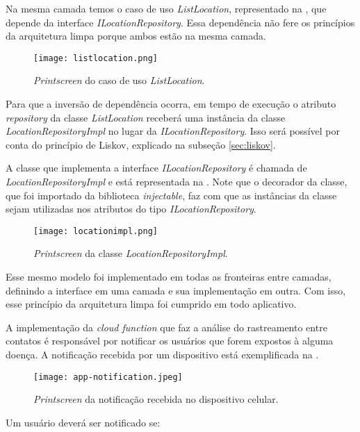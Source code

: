 Na mesma camada temos o caso de uso \textit{ListLocation}, representado na , que depende da interface \textit{ILocationRepository}. Essa dependência não fere os princípios da arquitetura limpa porque ambos estão na mesma camada.

\begin{figure}[!htb]
  \centering
  \texttt{[image: listlocation.png]}
  \caption{\textit{Printscreen} do caso de uso \textit{ListLocation}.}
  \label{fig:listlocation}
\end{figure}

Para que a inversão de dependência ocorra, em tempo de execução o atributo \textit{repository} da classe \textit{ListLocation} receberá uma instância da classe \textit{LocationRepositoryImpl} no lugar da \textit{ILocationRepository}. Isso será possível por conta do princípio de Liskov, explicado na subseção \ref{sec:liskov}.

A classe que implementa a interface \textit{ILocationRepository} é chamada de \textit{LocationRepositoryImpl} e está representada na . Note que o decorador da classe, que foi importado da biblioteca \textit{injectable}, faz com que as instâncias da classe sejam utilizadas nos atributos do tipo \textit{ILocationRepository}.

\begin{figure}[!htb]
  \centering
  \texttt{[image: locationimpl.png]}
  \caption{\textit{Printscreen} da classe \textit{LocationRepositoryImpl}.}
  \label{fig:locationimpl}
\end{figure}

Esse mesmo modelo foi implementado em todas as fronteiras entre camadas, definindo a interface em uma camada e sua implementação em outra. Com isso, esse princípio da arquitetura limpa foi cumprido em todo aplicativo.

A implementação da \textit{cloud function} que faz a análise do rastreamento entre contatos é responsável por notificar os usuários que forem expostos à alguma doença. A notificação recebida por um dispositivo está exemplificada na .

\begin{figure}[!htb]
  \centering
  \texttt{[image: app-notification.jpeg]}
  \caption{\textit{Printscreen} da notificação recebida no dispositivo celular.}
  \label{fig:appnotification}
\end{figure}

Um usuário deverá ser notificado se:

